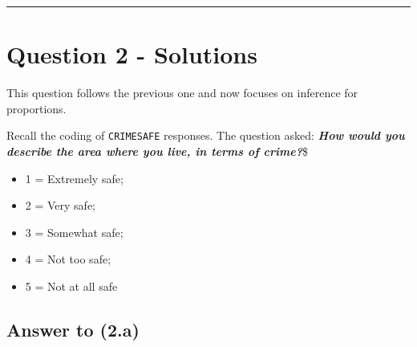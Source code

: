 \documentclass[
  11pt,
]{article}
\providecommand{\tightlist}{%
  \setlength{\itemsep}{0pt}\setlength{\parskip}{0pt}}
\begin{document}
\begin{center}\rule{0.5\linewidth}{0.5pt}\end{center}

\section{Question 2 - Solutions}\label{question-2---solutions}

This question follows the previous one and now focuses on inference for
proportions.

Recall the coding of \texttt{CRIMESAFE} responses. The question asked:
\textbf{\emph{How would you describe the area where you live, in terms
of crime?}}\$

\begin{itemize}
\tightlist
\item
  1 = Extremely safe;
\item
  2 = Very safe;
\item
  3 = Somewhat safe;
\item
  4 = Not too safe;
\item
  5 = Not at all safe
\end{itemize}

\subsection{Answer to (2.a)}\label{answer-to-2.a}
\end{document}
